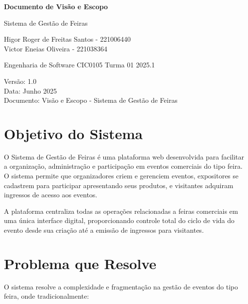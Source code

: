 \documentclass[12pt,a4paper]{article}
\begin{document}
\begin{titlepage}
\centering
\vspace*{2cm}

{\Huge\bfseries Documento de Visão e Escopo}

\vspace{0.5cm}

{\LARGE Sistema de Gestão de Feiras}

\vspace{2cm}

{\large Higor Roger de Freitas Santos - 221006440\\
Victor Eneias Oliveira - 221038364}

\vspace{1cm}

{\large Engenharia de Software CIC0105 Turma 01 2025.1}

\vfill

{\large Versão: 1.0\\
Data: Junho 2025\\
Documento: Visão e Escopo - Sistema de Gestão de Feiras}

\end{titlepage}

\newpage
\tableofcontents
\newpage

\section{Objetivo do Sistema}

O Sistema de Gestão de Feiras é uma plataforma web desenvolvida para facilitar a organização, administração e participação em eventos comerciais do tipo feira. O sistema permite que organizadores criem e gerenciem eventos, expositores se cadastrem para participar apresentando seus produtos, e visitantes adquiram ingressos de acesso aos eventos.

A plataforma centraliza todas as operações relacionadas a feiras comerciais em uma única interface digital, proporcionando controle total do ciclo de vida do evento desde sua criação até a emissão de ingressos para visitantes.

\section{Problema que Resolve}

O sistema resolve a complexidade e fragmentação na gestão de eventos do tipo feira, onde tradicionalmente:
\end{document}
